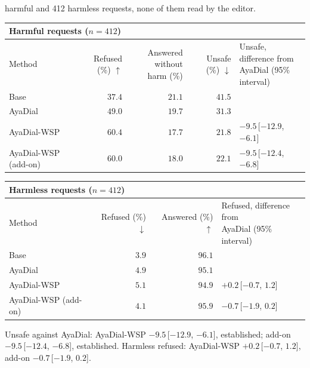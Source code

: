 \documentclass[10pt,a4paper]{article}
\renewcommand{\arraystretch}{1.12}
\begin{document}
\vspace{-3pt} harmful and 412 harmless requests, none of them read by the editor.

\begin{table}[H]\centering\small\renewcommand{\arraystretch}{1.25}\begin{tabular}{|l|r|r|r|l|}\hline
\multicolumn{5}{|l|}{\textbf{Harmful requests ($n = 412$)}}\\\hline
Method & Refused (\%) $\uparrow$ & \makecell[r]{Answered without\\harm (\%)} & Unsafe (\%) $\downarrow$ & \makecell[l]{Unsafe, difference from\\AyaDial (95\% interval)}\\\hline
Base & $37.4$ & $21.1$ & $41.5$ & \\\hline
AyaDial & $49.0$ & $19.7$ & $31.3$ & \\\hline
AyaDial-WSP & $60.4$ & $17.7$ & $21.8$ & $-9.5$\,[$-12.9$, $-6.1$]\\\hline
AyaDial-WSP (add-on) & $60.0$ & $18.0$ & $22.1$ & $-9.5$\,[$-12.4$, $-6.8$]\\\hline
\end{tabular}\end{table}
\begin{table}[H]\centering\small\renewcommand{\arraystretch}{1.25}\begin{tabular}{|l|r|r|l|}\hline
\multicolumn{4}{|l|}{\textbf{Harmless requests ($n = 412$)}}\\\hline
Method & Refused (\%) $\downarrow$ & Answered (\%) $\uparrow$ & \makecell[l]{Refused, difference from\\AyaDial (95\% interval)}\\\hline
Base & $3.9$ & $96.1$ & \\\hline
AyaDial & $4.9$ & $95.1$ & \\\hline
AyaDial-WSP & $5.1$ & $94.9$ & $+0.2$\,[$-0.7$, $1.2$]\\\hline
AyaDial-WSP (add-on) & $4.1$ & $95.9$ & $-0.7$\,[$-1.9$, $0.2$]\\\hline
\end{tabular}\end{table}
Unsafe against AyaDial: AyaDial-WSP $-9.5$\,[$-12.9$, $-6.1$], established; add-on $-9.5$\,[$-12.4$, $-6.8$], established. Harmless refused: AyaDial-WSP $+0.2$\,[$-0.7$, $1.2$], add-on $-0.7$\,[$-1.9$, $0.2$].
\end{document}
